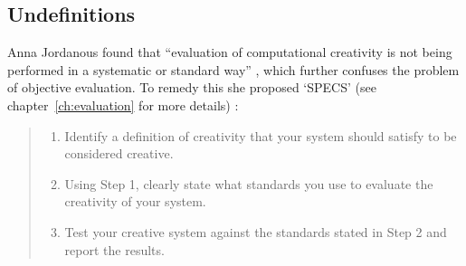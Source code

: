 

%



\subsection{Undefinitions}

Anna Jordanous found that ``evaluation of computational creativity is not being performed in a systematic or standard way'' \autocite*{Jordanous2011}, which further confuses the problem of objective evaluation. To remedy this she proposed `\ac{SPECS}' (see chapter~\ref{ch:evaluation} for more details) \autocite*{Jordanous2012a}:

\begin{quote}
  \begin{enumerate}
    \item Identify a definition of creativity that your system should satisfy to be considered creative.
    \item Using Step \num{1}, clearly state what standards you use to evaluate the creativity of your system.
    \item Test your creative system against the standards stated in Step \num{2} and report the results.
  \end{enumerate}
\end{quote}

